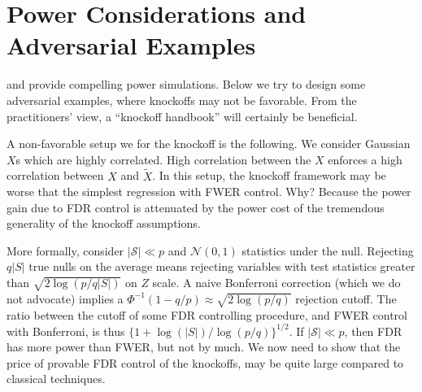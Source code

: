 \documentclass[article,lineno]{biometrika}
\begin{document}
	
	
	
	
	\section{Power Considerations and Adversarial Examples}
	
	
	\cite{SesiaGenehuntinghidden} and \cite{CandesPanninggoldmodelX2018} provide compelling power simulations.
	Below we try to design some adversarial examples, where knockoffs may not be favorable.
	From the practitioners' view, a ``knockoff handbook'' will certainly be beneficial.
	
	A non-favorable setup we  for the knockoff is the following. 
	We consider Gaussian $X$s which are highly correlated. High correlation between the $X$ enforces a high correlation between  $X$ and $\tilde X$. 
	In this setup, the knockoff framework may be  worse that the simplest regression with FWER control.
	Why?
	Because the power gain due to FDR control is attenuated by the power cost of the tremendous generality of the knockoff assumptions.
	
	More formally, consider $|\mathcal{S}|\ll p$ and $\mathcal{N}(0,1)$ statistics under the null.	
	Rejecting $q|S|$ true nulls on the average means rejecting variables with test statistics greater than $\sqrt{2\log(p/q|S|)}$ on $Z$ scale.
	A naive Bonferroni correction (which we do not advocate) implies a $\Phi^{-1}(1-q/p)\approx\sqrt{2\log (p/q)}$ rejection cutoff.
	The ratio between the cutoff of some FDR controlling procedure, and FWER control with Bonferroni, is thus $\bigl\{1+\log(|S|)/\log (p/q)\bigr\}^{1/2}$. 
	If $|\mathcal{S}|\ll p$, then FDR has more power than FWER, but not by much. 
	We now need to show that the price of provable FDR control of the knockoffs, may be quite large compared to classical techniques.
	
\end{document}
